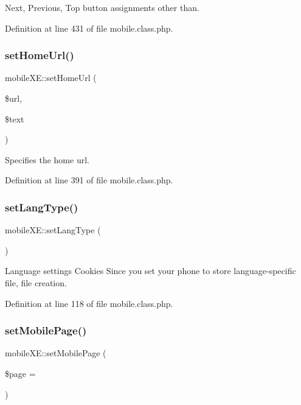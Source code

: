 Next, Previous, Top button assignments other than. 



Definition at line 431 of file mobile.\+class.\+php.

\mbox{\label{classmobileXE_a7833bbd0ed8b32aa5461b8b89a4c2fa0}} 
\subsubsection{\texorpdfstring{set\+Home\+Url()}{setHomeUrl()}}
{\footnotesize\ttfamily mobile\+X\+E\+::set\+Home\+Url (\begin{DoxyParamCaption}\item[{}]{\$url,  }\item[{}]{\$text }\end{DoxyParamCaption})}



Specifies the home url. 



Definition at line 391 of file mobile.\+class.\+php.

\mbox{\label{classmobileXE_a4d844050feafe1844867f6352d4983c9}} 
\subsubsection{\texorpdfstring{set\+Lang\+Type()}{setLangType()}}
{\footnotesize\ttfamily mobile\+X\+E\+::set\+Lang\+Type (\begin{DoxyParamCaption}{ }\end{DoxyParamCaption})}



Language settings Cookies Since you set your phone to store language-\/specific file, file creation. 



Definition at line 118 of file mobile.\+class.\+php.

\mbox{\label{classmobileXE_a462ec879b69ab476662754aec66800dd}} 
\subsubsection{\texorpdfstring{set\+Mobile\+Page()}{setMobilePage()}}
{\footnotesize\ttfamily mobile\+X\+E\+::set\+Mobile\+Page (\begin{DoxyParamCaption}\item[{}]{\$page = {} }\end{DoxyParamCaption})}



